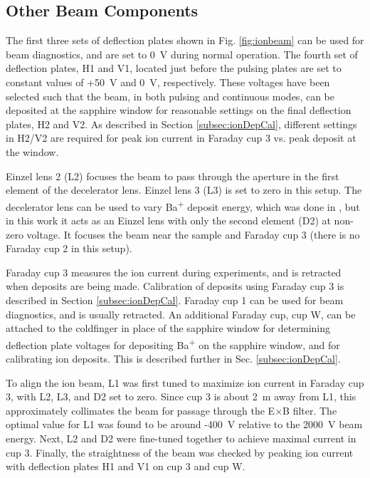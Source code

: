 \subsection{Other Beam Components}

The first three sets of deflection plates shown in Fig. \ref{fig:ionbeam} can be used for beam diagnostics, and are set to 0~V during normal operation.  The fourth set of deflection plates, H1 and V1, located just before the pulsing plates are set to constant values of +50~V and 0~V, respectively.  These voltages have been selected such that the beam, in both pulsing and continuous modes, can be deposited at the sapphire window for reasonable settings on the final deflection plates, H2 and V2.  As described in Section \ref{subsec:ionDepCal}, different settings in H2/V2 are required for peak ion current in Faraday cup 3 vs. peak deposit at the window.

Einzel lens 2 (L2) focuses the beam to pass through the aperture in the first element of the decelerator lens.  Einzel lens 3 (L3) is set to zero in this setup.  The decelerator lens can be used to vary Ba\textsuperscript{+} deposit energy, which was done in \cite{Shon}, but in this work it acts as an Einzel lens with only the second element (D2) at non-zero voltage.  It focuses the beam near the sample and Faraday cup 3 (there is no Faraday cup 2 in this setup).

Faraday cup 3 measures the ion current during experiments, and is retracted when deposits are being made.  Calibration of deposits using Faraday cup 3 is described in Section \ref{subsec:ionDepCal}.  Faraday cup 1 can be used for beam diagnostics, and is usually retracted.  An additional Faraday cup, cup W, can be attached to the coldfinger in place of the sapphire window for determining deflection plate voltages for depositing Ba\textsuperscript{+} on the sapphire window, and for calibrating ion deposits.  This is described further in Sec. \ref{subsec:ionDepCal}.

To align the ion beam, L1 was first tuned to maximize ion current in Faraday cup 3, with L2, L3, and D2 set to zero.  Since cup 3 is about 2~m away from L1, this approximately collimates the beam for passage through the E$\times$B filter.  The optimal value for L1 was found to be around -400~V relative to the 2000~V beam energy.  Next, L2 and D2 were fine-tuned together to achieve maximal current in cup 3.  Finally, the straightness of the beam was checked by peaking ion current with deflection plates H1 and V1 on cup 3 and cup W.

